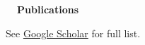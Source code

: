 \documentclass[a4paper,12pt]{article}
\newcommand{\resheading}[1]{{\vspace*{.001in} \colorbox{mygrey}{\begin{minipage}{\textwidth}{\textmd{\large \textbf{#1} \vphantom{p\^{E}}}}\end{minipage}}} }
\begin{document}
%
%
%
%

    \resheading{~~Publications}
    \vspace{-1em}
    {\setlength{\parskip}{8pt}

    See \href{https://scholar.google.com/citations?user=4ODJ78oAAAAJ}{Google Scholar} for full list.\\
    



    }
\end{document}

